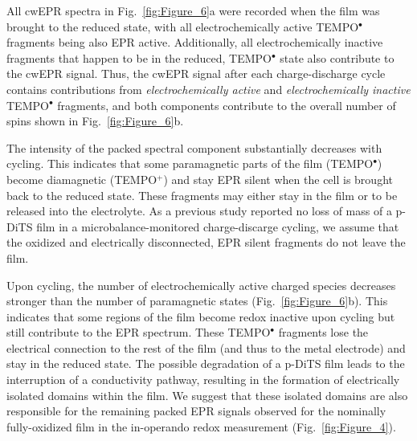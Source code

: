 \par
All cwEPR spectra in Fig.~\ref{fig:Figure_6}a were recorded when the film was brought to the reduced state, with all electrochemically active TEMPO$^\bullet$ fragments being also EPR active. Additionally, all electrochemically inactive fragments that happen to be in the reduced, TEMPO$^\bullet$ state also contribute to the cwEPR signal. Thus, the cwEPR signal after each charge-discharge cycle contains contributions from \emph{electrochemically active} and \emph{electrochemically inactive} TEMPO$^\bullet$ fragments, and both components contribute to the overall number of spins shown in Fig.~\ref{fig:Figure_6}b.

\par
The intensity of the packed spectral component substantially decreases with cycling. This indicates that some paramagnetic parts of the film (TEMPO$^{\bullet}$) become diamagnetic (TEMPO$^{+}$) and stay EPR silent when the cell is brought back to the reduced state. These fragments may either stay in the film or to be released into the electrolyte. 
As a previous study reported no loss of mass of a p-DiTS film in a microbalance-monitored charge-discarge cycling, \cite{vereshchagin2020_battandsupercaps} we assume that the oxidized and electrically disconnected, EPR silent fragments do not leave the film.



\par
Upon cycling, the number of electrochemically active charged species decreases stronger than the number of paramagnetic states (Fig.~\ref{fig:Figure_6}b). This  indicates that some regions of the film become redox inactive upon cycling but still contribute to the EPR spectrum. These TEMPO$^{\bullet}$ fragments lose the electrical connection to the rest of the film (and thus to the metal electrode) and stay in the reduced state. The possible degradation of a p-DiTS film leads to the interruption of a conductivity pathway, resulting in the formation of electrically isolated domains within the film. We suggest that these isolated domains are also responsible for the remaining packed EPR signals observed for the nominally fully-oxidized film in the in-operando redox measurement (Fig.~\ref{fig:Figure_4}).



